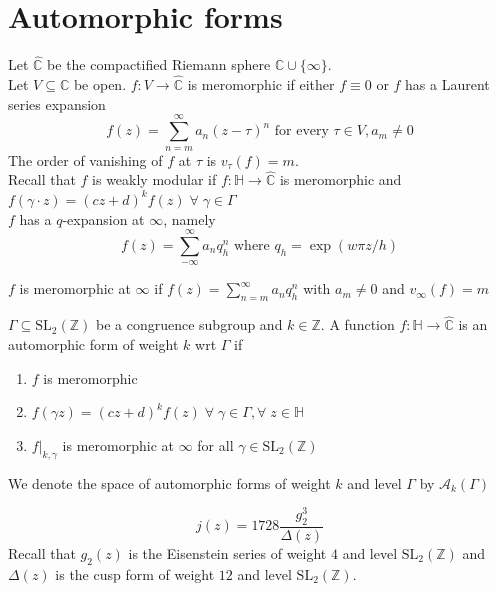 \documentclass[oneside, 12pt]{scrbook}
\newcommand{\CC}{\mathbb C}
\newcommand{\ZZ}{\mathbb Z}
\newcommand{\SL}{\mathrm{SL}}
\newcommand{\HH}{\mathbb{H}}
\theoremstyle{theorem}
\begin{document}
\section{Automorphic forms}

Let $\widehat{\CC}$ be the compactified Riemann sphere $\CC \cup \{\infty\}$. \\

Let $V \subseteq \CC$ be open. $f: V \rightarrow \widehat{\CC}$ is meromorphic if either $f \equiv 0$ or $f$ has a Laurent series expansion 
\begin{equation}
f(z) = \sum_{n=m}^{\infty} a_{n} (z  - \tau)^n \text{ for every } \tau \in V , a_{m} \neq 0
\end{equation}
The order of vanishing of $f$ at $\tau$ is $v_{\tau}(f) = m$. \\

Recall that $f$ is weakly modular if $f: \mathbb{H} \rightarrow \widehat{\CC}$ is meromorphic and $f(\gamma \cdot z) = (cz+d)^k f(z) \; \forall \; \gamma \in \Gamma$ \\

$f$ has a $q$-expansion at $\infty$, namely 
\begin{equation}
f(z) = \sum_{-\infty}^{\infty} a_{n}q_{h}^n  \text{  where }q_{h} = \exp(w\pi z/h)
\end{equation}

$f$ is meromorphic at $\infty$ if $f(z) = \sum_{n=m}^{\infty} a_{n}q_{h}^n$ with $a_{m} \neq 0$ and $v_{\infty}(f) = m$

\begin{definition}
$\Gamma \subseteq \SL_{2}(\ZZ)$ be a congruence subgroup and $k \in \ZZ$. A function $f: \HH \rightarrow \widehat{\CC}$ is an automorphic form  of weight $k$ wrt $\Gamma$ if 
\begin{enumerate}
\item $f$ is meromorphic 
\item $f(\gamma z) = (cz+d)^{k} f(z) \; \forall \; \gamma \in \Gamma , \forall \; z \in \HH$
\item $f|_{k, \gamma}$ is meromorphic at $\infty$ for all $\gamma \in \SL_{2}(\ZZ)$
\end{enumerate}

We denote the space of automorphic forms of weight $k$ and level $\Gamma$ by $\mathcal{A}_{k}(\Gamma)$
\end{definition}

\begin{example}
\begin{equation}
j(z)= 1728 \frac{g_{2}^3}{\Delta (z)}
\end{equation}
Recall that $g_{2}(z)$ is the Eisenstein series of weight $4$ and level $\SL_{2}(\ZZ)$ and $\Delta (z)$ is the cusp form of weight $12$ and level $\SL_{2}(\ZZ)$. 
\end{example}
\end{document}
